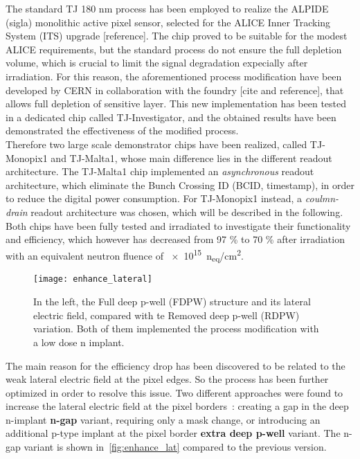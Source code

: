 The standard TJ 180 nm process has been employed to realize the ALPIDE (sigla) monolithic active pixel sensor, selected for the ALICE Inner Tracking System (ITS) upgrade [reference].
The chip proved to be suitable for the modest ALICE requirements, but the standard process do not ensure the full depletion volume, which is crucial to limit the signal degradation expecially after irradiation. For this reason, the aforementioned process modification have been developed by CERN in collaboration with the foundry [cite and reference], that allows full depletion of sensitive layer. This new implementation has been tested in a dedicated chip called TJ-Investigator, and the obtained results have been demonstrated the effectiveness of the modified process. \\
Therefore two large scale demonstrator chips have been realized, called TJ-Monopix1 and TJ-Malta1, whose main difference lies in the different readout architecture. The TJ-Malta1 chip implemented an \textit{asynchronous} readout architecture, which eliminate the Bunch Crossing ID (BCID, timestamp), in order to reduce the digital power consumption. For TJ-Monopix1 instead, a \textit{coulmn-drain} readout architecture was chosen, which will be described in the following. Both chips have been fully tested and irradiated to investigate their functionality and efficiency, which however has decreased from 97 \% to 70 \% after irradiation with an equivalent neutron fluence of \SI{e15}{n_{eq}/cm^{2}}. 

\begin{figure}[h!]
\centering
\texttt{[image: enhance\_lateral]}
\caption{In the left, the Full deep p-well (FDPW) structure and its lateral electric field, compared with te Removed deep p-well (RDPW) variation. Both of them implemented the process modification with a low dose n implant.}
\label{fig:enhance_lat}
\end{figure}


The main reason for the efficiency drop has been discovered to be related to the weak lateral electric field at the pixel edges. So the process has been further optimized in order to resolve this issue. Two different approaches were found to increase the lateral electric field at the pixel borders~\cite{Munker_2019}: creating a gap in the deep n-implant \textbf{n-gap} variant, requiring only a mask change, or introducing an additional p-type implant at the pixel border \textbf{extra deep p-well} variant. The n-gap variant is shown in~\autoref{fig:enhance_lat} compared to the previous version.

